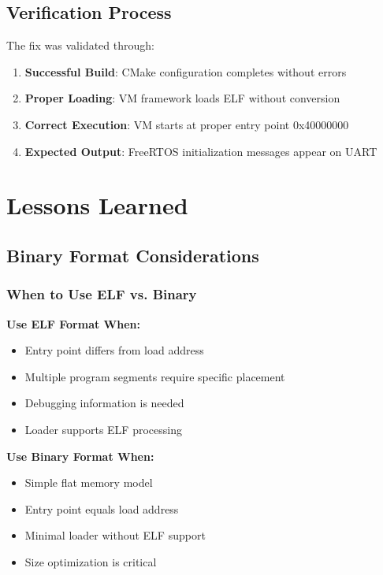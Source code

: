 \documentclass[11pt,a4paper]{article}
\begin{document}
\subsection{Verification Process}

The fix was validated through:

\begin{enumerate}
\item \textbf{Successful Build}: CMake configuration completes without errors
\item \textbf{Proper Loading}: VM framework loads ELF without conversion
\item \textbf{Correct Execution}: VM starts at proper entry point 0x40000000
\item \textbf{Expected Output}: FreeRTOS initialization messages appear on UART
\end{enumerate}

\section{Lessons Learned}

\subsection{Binary Format Considerations}

\subsubsection{When to Use ELF vs. Binary}

\textbf{Use ELF Format When:}
\begin{itemize}
\item Entry point differs from load address
\item Multiple program segments require specific placement
\item Debugging information is needed
\item Loader supports ELF processing
\end{itemize}

\textbf{Use Binary Format When:}
\begin{itemize}
\item Simple flat memory model
\item Entry point equals load address
\item Minimal loader without ELF support
\item Size optimization is critical
\end{itemize}
\end{document}
